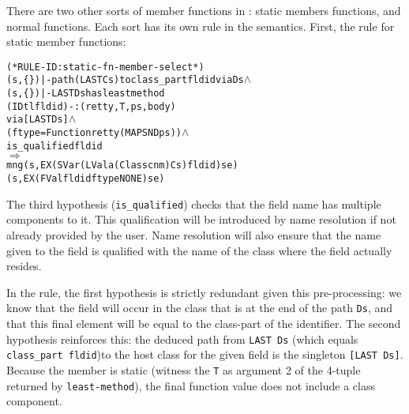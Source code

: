 \documentclass[11pt]{article}
\newcommand{\lbr}{\texttt{\{}}
\newcommand{\rbr}{\texttt{\}}}
\begin{document}
There are two other sorts of member functions in \cpp{}: static
members functions, and normal functions.  Each sort has its own rule
in the semantics.
First, the rule for static member functions:
\begin{center}
\begin{minipage}{\textwidth}
%
\begin{alltt}
(* RULE-ID: static-fn-member-select *)
     (s,\lbr\rbr) |- path (LAST Cs) to class_part fldid via Ds \(\land\)
     (s,\lbr\rbr) |- LAST Ds has least method
                  (IDtl fldid) -: (retty,T,ps,body)
                  via [LAST Ds] \(\land\)
     (ftype = Function retty (MAP SND ps)) \(\land\)
     is_qualified fldid
   \(\Rightarrow\)
     mng (s, EX (SVar (LVal a (Class cnm) Cs) fldid) se)
         (s, EX (FVal fldid ftype NONE) se)
\end{alltt}
\end{minipage}
\end{center}
%
The third hypothesis (\texttt{is_qualified}) checks that the field
name has multiple components to it.  This qualification will be
introduced by name resolution if not already provided by the user.
Name resolution will also ensure that the name given to the field is
qualified with the name of the class where the field actually
resides.

%
In the rule, the first hypothesis is strictly redundant given this
pre-processing: we know that the field will occur in the class that is
at the end of the path \texttt{Ds}, and that this final element will
be equal to the class-part of the identifier.  The second hypothesis
reinforces this: the deduced path from \texttt{LAST~Ds} (which equals
\texttt{class_part~fldid})to the host class for the given field is the
singleton \texttt{[LAST~Ds]}.  Because the member is static (witness
the \texttt{T} as argument 2 of the 4-tuple returned by
\texttt{least-method}), the final function value does not include a
class component.
\end{document}
